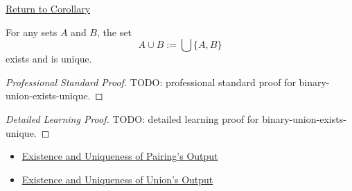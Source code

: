 \newpage
{}
\label{prf:binary-union-exists-unique}

\begin{remark*}[Return]
\hyperref[cor:binary-union-exists-unique]{Return to Corollary}
\end{remark*}

\begin{corollary*}
For any sets $A$ and $B$, the set
\[
  A\cup B:=\bigcup\{A,B\}
\]
exists and is unique.
\end{corollary*}

\begin{proof}[Professional Standard Proof]
\LRAProofBodyStart
TODO: professional standard proof for binary-union-exists-unique.
\end{proof}

\begin{proof}[Detailed Learning Proof]
\LRAProofBodyStart
TODO: detailed learning proof for binary-union-exists-unique.
\end{proof}

\begin{remark*}
\end{remark*}

\begin{dependencies}
\begin{itemize}
  \item \hyperref[thm:pairing-output-exists-unique]{Existence and Uniqueness of Pairing's Output}
  \item \hyperref[thm:union-output-exists-unique]{Existence and Uniqueness of Union's Output}
\end{itemize}
\end{dependencies}

\clearpage

